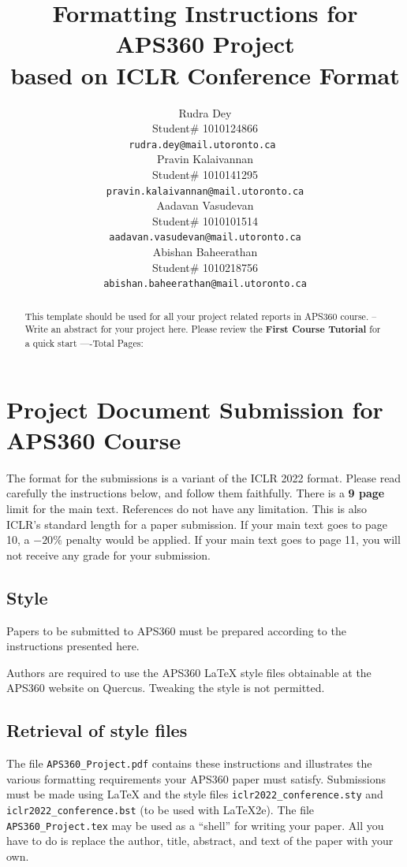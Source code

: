 \documentclass{article} %
\title{Formatting Instructions for APS360 Project  \\ 
based on ICLR Conference Format}
\author{Rudra Dey  \\
Student\# 1010124866\\
\texttt{rudra.dey@mail.utoronto.ca } \\
\And
Pravin Kalaivannan  \\
Student\# 1010141295 \\
\texttt{pravin.kalaivannan@mail.utoronto.ca} \\
\AND
Aadavan Vasudevan  \\
Student\# 1010101514 \\
\texttt{aadavan.vasudevan@mail.utoronto.ca} \\
\And
Abishan Baheerathan \\
Student\# 1010218756 \\
\texttt{abishan.baheerathan@mail.utoronto.ca} \\
\AND
}
\begin{document}
\maketitle

\begin{abstract}
This template should be used for all your project related reports in APS360 course. -- Write an abstract for your project here. Please review the \textbf{ First Course Tutorial} for a quick start
----Total Pages: \pageref{last_page}
\end{abstract}



\section{Project Document Submission for APS360 Course}


The format for the submissions is a variant of the ICLR 2022 format.
Please read carefully the instructions below, and follow them
faithfully. There is a \textbf{9 page} limit for the main text. References do not have any limitation. This is also ICLR's standard length for a paper submission. 
If your main text goes to page 10, a $-20\%$ penalty would be applied. If your main text goes to page 11, you will not receive any grade for your submission. 

\subsection{Style}

Papers to be submitted to APS360 must be prepared according to the
instructions presented here.

Authors are required to use the APS360 \LaTeX{} style files obtainable at the
APS360 website on Quercus. Tweaking the style is not permitted.

\subsection{Retrieval of style files}

The file \verb+APS360_Project.pdf+ contains these
instructions and illustrates the various formatting requirements your APS360 paper must satisfy.
Submissions must be made using \LaTeX{} and the style files
\verb+iclr2022_conference.sty+ and \verb+iclr2022_conference.bst+ (to be used with \LaTeX{}2e). The file
\verb+APS360_Project.tex+ may be used as a ``shell'' for writing your paper. All you have to do is replace the author, title, abstract, and text of the paper with
your own.
\end{document}
